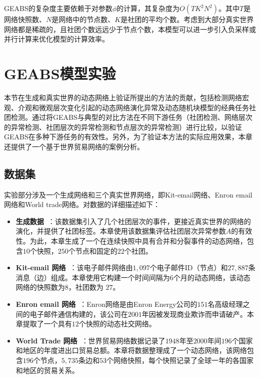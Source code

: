 GEABS的复杂度主要依赖于对参数$\phi$的计算，其复杂度为$O(TK^2N^2)$。其中$T$是网络快照数、$N$是网络中的节点数、$K$是社团的平均个数。考虑到大部分真实世界网络都是稀疏的，且社团个数远远少于节点个数，本模型可以进一步引入负采样或并行计算来优化模型的计算效率。

\section{GEABS模型实验\label{chap4:experiment}}

本节在生成和真实世界的动态网络上验证所提出的方法的贡献，包括检测网络宏观、介观和微观层次变化引起的动态网络演化异常及动态随机块模型的经典任务社团检测。通过将GEABS与典型的对比方法在不同下游任务（社团检测、网络层次的异常检测、社团层次的异常检测和节点层次的异常检测）进行比较，以验证GEABS在多种下游任务的有效性。另外，为了验证本方法的实际应用效果，本章还提供了一个基于世界贸易网络的案例分析。

\subsection{数据集}

实验部分涉及一个生成网络和三个真实世界网络，即Kit-email网络、Enron email网络和World trade网络。对数据的详细描述如下：

\begin{itemize}

\item \textbf{生成数据~\cite{greene2010tracking}}：该数据集引入了几个社团层次的事件，更接近真实世界的网络的演化，并提供了社团标签。本章使用该数据集评估社团层次异常参数$A$的有效性。为此，本章生成了一个在连续快照中具有合并和分裂事件的动态网络，包含$10$个快照，$250$个节点和固定的$22$个社团。

\item \textbf{Kit-email 网络~\cite{gorkedynamic}}：该电子邮件网络由$1,097$个电子邮件ID（节点）和$27,887$条消息（边）组成。本章使用它构建一个时间间隔为$6$个月的动态网络，该动态网络的快照数为$8$，社团数为 $27$。

\item \textbf{Enron email 网络~\cite{benston2002enron}}：Enron网络是由Enron Energy公司的$151$名高级经理之间的电子邮件通信构建的，该公司在$2001$年因被发现商业欺诈而申请破产。本章提取了一个具有$12$个快照的动态社交网络。

\item \textbf{World Trade 网络~\cite{worldset2002}}：世界贸易网络数据记录了$1948$年至$2000$年间$196$个国家和地区的年度进出口贸易总额。本章将数据整理成了一个动态网络，该网络包含$196$个节点，$5,735$条边和$53$个网络快照，每个快照记录了全球一年的各国家和地区的贸易关系。
\end{itemize}




